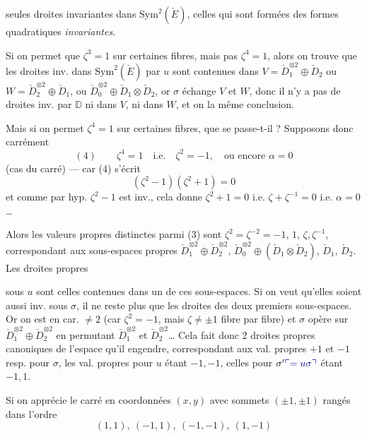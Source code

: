 \documentclass[11pt,a4paper]{article}
\begin{document}
seules droites invariantes  dans $\mathrm{Sym}^2(\check{E})$,  celles qui sont formées des formes quadratiques \emph{invariantes}.

Si on permet que $\zeta^{3} = 1$ sur certaines fibres, \struck{\ill{}} mais pas $\zeta^{4} = 1$, alors on trouve que les droites inv. dans $\mathrm{Sym}^2(\check{E})$ par $u$ sont contenues  dans $V = \check{D}_1^{\otimes 2} \oplus \check{D}_2$ ou $W = \check{D}_2^{\otimes 2} \oplus \check{D}_1$, ou $\check{D}_0^{\otimes 2} \oplus \check{D}_1 \otimes \check{D}_2$, or $\sigma$ échange $V$ et $W$, donc il n'y a pas de droites inv. par $\mathbb{D}$ ni dans $V$, ni dans $W$, et on \struck{\ill{}}  la même conclusion.%

Mais si on permet $\zeta^{4} = 1$ sur certaines fibres, que se passe-t-il ? Supposons donc carrément
\[
  (4) \qquad \zeta^{4} = 1 \quad \text{i.e.} \quad \zeta^{2} = -1, \quad \text{ou encore } \alpha = 0
\]
(cas du carré) --- car (4) s'écrit
\[
  (\zeta^{2} - 1)(\zeta^{2} + 1) = 0
\]
et comme par hyp. $\zeta^{2} - 1$ est inv., cela donne $\zeta^{2} + 1 = 0$ i.e. $\zeta + \zeta^{-1} = 0$ i.e. $\alpha = 0$…

Alors les valeurs propres distinctes parmi (3) \struck{\ill{}} sont $\zeta^{2} = \zeta^{-2} = -1$, $1$, $\zeta, \zeta^{-1}$, correspondant aux sous-espaces propres $\check{D}_1^{\otimes 2} \oplus \check{D}_2^{\otimes 2}$, $\check{D}_0^{\otimes 2} \oplus (\check{D}_1 \otimes \check{D}_2)$, $\check{D}_1$, $\check{D}_2$. Les droites propres

sous $u$ sont celles contenues dans un de ces sous-espaces. Si on veut qu'elles soient aussi inv. sous $\sigma$, il ne reste plus que les droites des deux premiers sous-espaces. Or on est en car. $\neq 2$ (car $\zeta^{2} = -1$, mais $\zeta \neq \pm 1$ fibre par fibre) et $\sigma$ opère sur $\check{D}_1^{\otimes 2} \oplus \check{D}_2^{\otimes 2}$ en permutant $\check{D}_1^{\otimes 2}$ et $\check{D}_2^{\otimes 2}$… Cela fait donc 2 droites propres canoniques de l'espace qu'il engendre, correspondant aux val. propres $+1$ et $-1$ resp. pour $\sigma$, les val. propres pour $u$ étant $-1, -1$, celles pour $\sigma' \add{= u\sigma}$ \struck{\ill{}} étant $-1, 1$.

Si on apprécie le carré en coordonnées $(x,y)$ avec sommets $(\pm 1, \pm 1)$ \struck{\ill{}} rangés dans l'ordre
\[
  (1,1),\ (-1,1),\ (-1,-1),\ (1,-1)
\]
\end{document}
